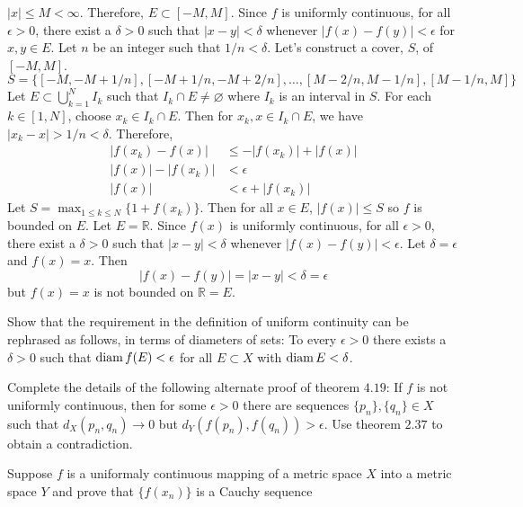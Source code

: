 \begin{exercise}
  \(\lvert x\rvert\leq M < \infty\).
  Therefore, \(E\subset [-M,M]\).
  Since \(f\) is uniformly continuous, for all \(\epsilon > 0\), there exist a
  \(\delta > 0\) such that \(\lvert x - y\rvert < \delta\) whenever
  \(\lvert f(x) - f(y)\rvert < \epsilon\) for \(x,y\in E\).
  Let \(n\) be an integer such that \(1/n < \delta\).
  Let's construct a cover, \(S\), of \([-M,M]\).
  \[
  S = \bigl\{[-M, -M + 1/n], [-M + 1/n, -M + 2/n],\ldots,[M - 2/n, M - 1/n],
  [M - 1/n, M]\bigr\}
  \]
  Let \(E\subset\bigcup_{k = 1}^NI_k\) such that \(I_k\cap E\neq\varnothing\)
  where \(I_k\) is an interval in \(S\).
  For each \(k\in[1,N]\), choose \(x_k\in I_k\cap E\).
  Then for \(x_k,x\in I_k\cap E\), we have
  \(\lvert x_k - x\rvert > 1/n < \delta\).
  Therefore,
  \begin{align*}
    \lvert f(x_k) - f(x)\rvert
    & \leq -\lvert f(x_k)\rvert + \lvert f(x)\rvert\\
    \lvert f(x)\rvert - \lvert f(x_k)\rvert & < \epsilon\\
    \lvert f(x)\rvert & < \epsilon + \lvert f(x_k)\rvert
  \end{align*}
  Let \(S = \max_{1\leq k\leq N}\{1 + f(x_k)\}\).
  Then for all \(x\in E\), \(\lvert f(x)\rvert\leq S\) so \(f\) is bounded on
  \(E\).
  Let \(E = \mathbb{R}\).
  Since \(f(x)\) is uniformly continuous, for all \(\epsilon > 0\), there exist
  a \(\delta > 0\) such that \(\lvert x - y\rvert < \delta\) whenever
  \(\lvert f(x) - f(y)\rvert < \epsilon\).
  Let \(\delta = \epsilon\) and \(f(x) = x\).
  Then
  \[
  \lvert f(x) - f(y)\rvert = \lvert x - y\rvert < \delta = \epsilon
  \]
  but \(f(x) = x\) is not bounded on \(\mathbb{R} = E\).
\item
  \label{4.9}
  Show that the requirement in the definition of uniform continuity can be
  rephrased as follows, in terms of diameters of sets: To every
  \(\epsilon > 0\) there exists a \(\delta > 0\) such that
  \(\operatorname{diam} f(E) < \epsilon\) for all \(E\subset X\) with \(\operatorname{diam} E < \delta\).
\item
  Complete the details of the following alternate  proof of theorem \(4.19\):
  If \(f\) is not uniformly continuous, then for some \(\epsilon > 0\) there
  are sequences \(\{p_n\},\{q_n\}\in X\) such that \(d_X(p_n,q_n)\to 0\) but
  \(d_Y(f(p_n),f(q_n)) > \epsilon\).
  Use theorem \(2.37\) to obtain a contradiction.
\item
  Suppose \(f\) is a uniformaly continuous mapping of a metric space \(X\)
  into a metric space \(Y\) and prove that \(\{f(x_n)\}\) is a Cauchy sequence

\end{exercise}
